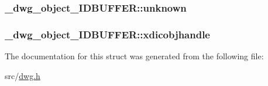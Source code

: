 \hypertarget{struct__dwg__object__IDBUFFER_ae1b33edb48d367e2097274adfde1340c}{
\subsubsection[{unknown}]{ {\bf \-\_\-dwg\-\_\-object\-\_\-\-I\-D\-B\-U\-F\-F\-E\-R\-::unknown}}}\label{struct__dwg__object__IDBUFFER_ae1b33edb48d367e2097274adfde1340c}
\hypertarget{struct__dwg__object__IDBUFFER_a543da78f67c665b1e41480c772708a8c}{
\subsubsection[{xdicobjhandle}]{ {\bf \-\_\-dwg\-\_\-object\-\_\-\-I\-D\-B\-U\-F\-F\-E\-R\-::xdicobjhandle}}}\label{struct__dwg__object__IDBUFFER_a543da78f67c665b1e41480c772708a8c}


\-The documentation for this struct was generated from the following file\-:\begin{DoxyCompactItemize}
\item 
src/\hyperlink{dwg_8h}{dwg.\-h}\end{DoxyCompactItemize}
